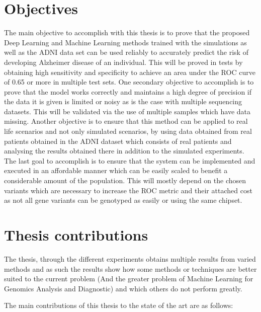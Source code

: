 \section{Objectives} \label{objectives}

The main objective to accomplish with this thesis is to prove that the proposed Deep Learning and Machine Learning methods trained with the simulations as well as the ADNI data set can be used reliably to accurately predict the risk of developing Alzheimer disease of an individual. This will be proved in tests by obtaining high sensitivity and specificity to achieve an area under the ROC curve of 0.65 or more in multiple test sets. One secondary objective to accomplish is to prove that the model works correctly and maintains a high degree of precision if the data it is given is limited or noisy as is the case with multiple sequencing datasets. This will be validated via the use of multiple samples which have data missing. Another objective is to ensure that this method can be applied to real life scenarios and not only simulated scenarios, by using data obtained from real patients obtained in the ADNI dataset which consists of real patients and analysing the results obtained there in addition to the simulated experiments. The last goal to accomplish is to ensure that the system can be implemented and executed in an affordable manner which can be easily scaled to benefit a considerable amount of the population. This will mostly depend on the chosen variants  which are necessary to increase the ROC metric and their attached cost as not all gene variants can be genotyped as easily or using the same chipset.                  



\section{Thesis contributions} \label{thesis_contributions}

The thesis, through the different experiments obtains multiple results from varied methods and as such the results show how some methods or techniques are better suited to the current problem (And the greater problem of Machine Learning for Genomics Analysis and Diagnostic) and which others do not perform greatly. 

The main contributions of this thesis to the state of the art are as follows:

